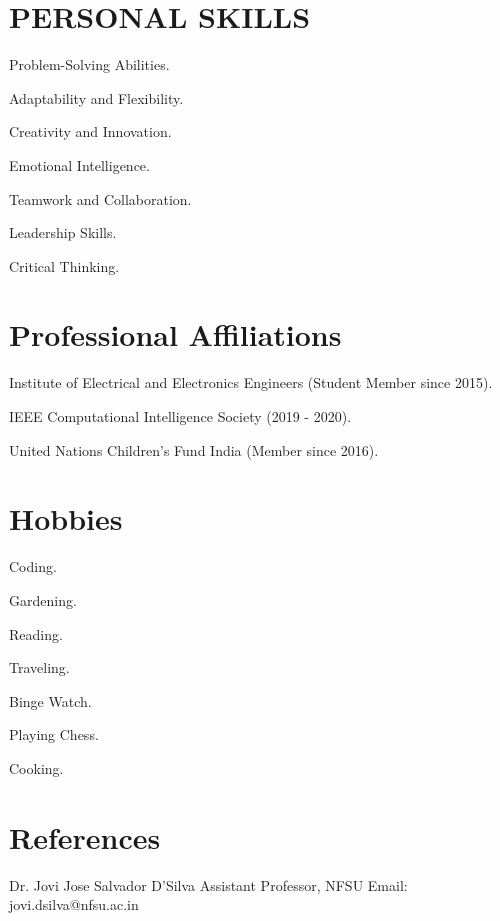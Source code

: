 \documentclass[fontsize=11pt]{tccv}
\begin{document}
\section{PERSONAL SKILLS}
\begin{skills}
\item {Problem-Solving Abilities.}
\item {Adaptability and Flexibility.}
\item {Creativity and Innovation.}
\item {Emotional Intelligence.}
\item {Teamwork and Collaboration.}
\item {Leadership Skills.}
\item {Critical Thinking.}
\end{skills}
\vspace{1em}

\section{Professional Affiliations}
\begin{skills}
\item {Institute of Electrical and Electronics Engineers (Student Member since 2015).}
\item {IEEE Computational Intelligence Society (2019 - 2020).}
\item {United Nations Children's Fund India (Member since 2016).}
\end{skills}
\vspace{1em}

\section{Hobbies}
\begin{skills}
\item {Coding.}
\item {Gardening.}
\item {Reading.}
\item {Traveling.}
\item {Binge Watch.} 
\item {Playing Chess.}
\item {Cooking.}
\end{skills}
\vspace{1em}

\section{References}
\vspace{-0.5em}
\begin{refer}
\item {Dr. Jovi Jose Salvador D'Silva}
      {Assistant Professor, NFSU}
      {Email: jovi.dsilva@nfsu.ac.in}
\end{refer}
\end{document}
